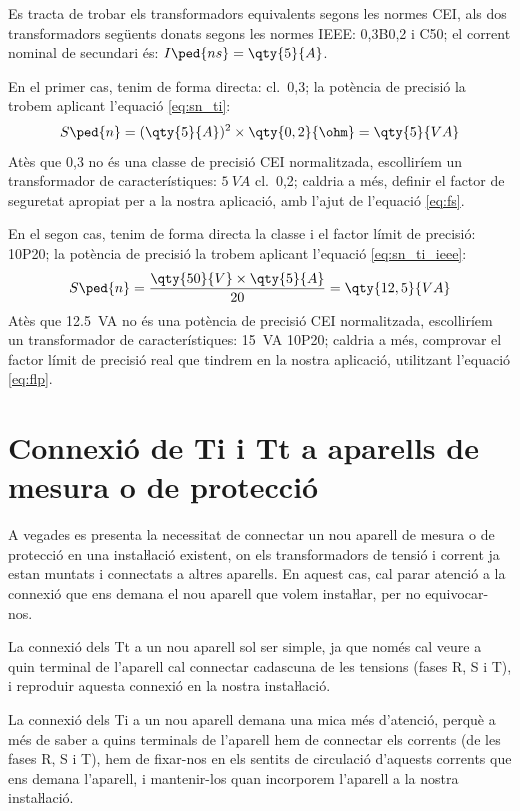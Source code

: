 \begin{exemple}[\TrafoIeeeEqCei{}]
	\addcontentsxms{\TrafoIeeeEqCei}
    Es tracta de trobar els transformadors equivalents segons les normes CEI, als dos
    transformadors següents donats segons les normes IEEE: 0,3B0,2 i
    C50; el corrent nominal de secundari és:    $I\ped{ns}=\qty{5}{A}$.

    En el primer cas, tenim de forma directa: cl.~0,3; la potència de precisió la trobem
    aplicant l'equació \eqref{eq:sn_ti}:
    \[
        S\ped{n} =(\qty{5}{A})^2 \times \qty{0,2}{\ohm} =  \qty{5}{VA}
    \]
    Atès que 0,3 no és una classe de precisió CEI normalitzada,
    escolliríem un transformador de característiques: $\qty{5}{VA}$ cl.~0,2; caldria a més, definir el factor de
    seguretat apropiat per a la nostra aplicació, amb l'ajut de l'equació \eqref{eq:fs}.

    En el segon cas, tenim de forma directa la classe i el factor límit de
    precisió: 10P20; la potència de precisió la trobem
    aplicant l'equació \eqref{eq:sn_ti_ieee}:
    \[
        S\ped{n} = \frac{\qty{50}{V} \times\qty{5}{A}}{20} = \qty{12,5}{VA}
    \]
    Atès que \SI{12,5}{VA} no és una potència de precisió CEI normalitzada,
     escolliríem un transformador de característiques:
    \SI{15}{VA} 10P20; caldria a més, comprovar el factor límit de precisió real
    que tindrem en la nostra aplicació, utilitzant l'equació \eqref{eq:flp}.
\end{exemple}

\section{Connexió de Ti i Tt a aparells de mesura o de
protecció}\label{sec:conex_ti_tt}

A vegades es presenta la necessitat de connectar un nou aparell de
mesura o de protecció en una instaŀlació existent, on els
transformadors de tensió i corrent ja estan muntats i connectats a
altres aparells. En aquest cas, cal parar atenció a la connexió
que ens demana el nou aparell que volem instaŀlar, per  no
equivocar-nos.

La connexió dels Tt a un nou aparell sol ser simple, ja que només
cal veure a quin terminal de l'aparell cal connectar cadascuna de
les tensions (fases R, S i T), i reproduir aquesta connexió en la
nostra instaŀlació.

La connexió dels Ti a un nou aparell demana una mica més
d'atenció, perquè a més de saber a  quins terminals de l'aparell hem
de connectar els corrents (de les fases R, S i T), hem de fixar-nos
en els sentits de circulació d'aquests corrents que ens demana
l'aparell, i mantenir-los quan incorporem l'aparell a la nostra
instaŀlació.

